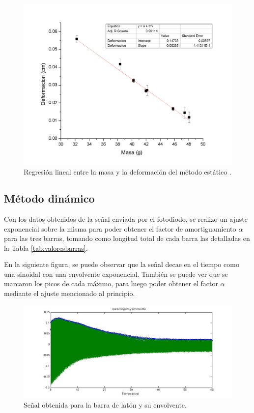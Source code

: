 \documentclass[twoside,twocolumn,a4paper]{article}
\begin{document}
\begin{figure}[H]
\includegraphics[width=\linewidth]{regrlin.png}
\caption{Regresi\'on lineal entre la masa y la deformaci\'on del m\'etodo est\'atico .}
\label{fig:regrlin}
\end{figure}






\subsection{M\'etodo din\'amico}

Con los datos obtenidos de la se\~nal enviada por el fotodiodo, se realizo un ajuste exponencial sobre la misma para poder obtener el factor de amortiguamiento $\alpha$ para las tres barras, tomando como longitud total de cada barra las detalladas en la Tabla \ref{tab:valoresbarras}. \newline

En la siguiente figura, se puede observar que la se\~nal decae en el tiempo como una sinoidal con una envolvente exponencial. Tambi\'en se puede ver que se marcaron los picos de cada m\'aximo, para luego poder obtener el factor $\alpha$ mediante el ajuste mencionado al principio.

\begin{figure}[H]
\includegraphics[width=\linewidth]{senalenvolvente.jpg}
\caption{Se\~nal obtenida para la barra de lat\'on y su envolvente.}
\label{fig:senalenvolvente}
\end{figure}
\end{document}
